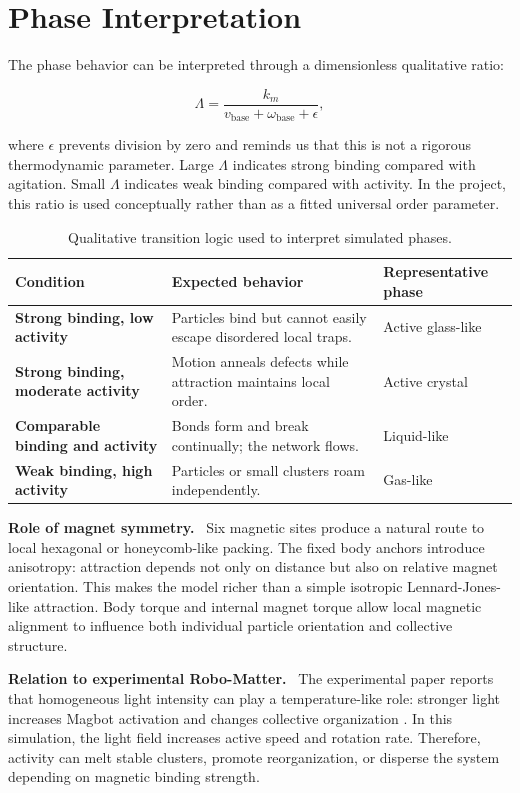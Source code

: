 \documentclass[12pt,a4paper,oneside]{report}
\newcommand{\runin}[1]{\vspace{0.45em}\noindent\textbf{#1.}\ }
\begin{document}
\section{Phase Interpretation}
The phase behavior can be interpreted through a dimensionless qualitative ratio:

\begin{equation}
\Lambda =
\frac{k_m}{v_{\mathrm{base}}+\omega_{\mathrm{base}}+\epsilon},
\end{equation}

where $\epsilon$ prevents division by zero and reminds us that this is not a rigorous thermodynamic parameter. Large $\Lambda$ indicates strong binding compared with agitation. Small $\Lambda$ indicates weak binding compared with activity. In the project, this ratio is used conceptually rather than as a fitted universal order parameter.

\begin{table}[H]
\centering
\caption{Qualitative transition logic used to interpret simulated phases.}
\label{tab:transitionlogic}
\begin{tabularx}{\textwidth}{>{\bfseries}p{3.2cm}X X}
\toprule
Condition & Expected behavior & Representative phase \\
\midrule
Strong binding, low activity & Particles bind but cannot easily escape disordered local traps. & Active glass-like \\
Strong binding, moderate activity & Motion anneals defects while attraction maintains local order. & Active crystal \\
Comparable binding and activity & Bonds form and break continually; the network flows. & Liquid-like \\
Weak binding, high activity & Particles or small clusters roam independently. & Gas-like \\
\bottomrule
\end{tabularx}
\end{table}

\runin{Role of magnet symmetry}
Six magnetic sites produce a natural route to local hexagonal or honeycomb-like packing. The fixed body anchors introduce anisotropy: attraction depends not only on distance but also on relative magnet orientation. This makes the model richer than a simple isotropic Lennard-Jones-like attraction. Body torque and internal magnet torque allow local magnetic alignment to influence both individual particle orientation and collective structure.

\runin{Relation to experimental Robo-Matter}
The experimental paper reports that homogeneous light intensity can play a temperature-like role: stronger light increases Magbot activation and changes collective organization \cite{wang2024robomatter}. In this simulation, the light field increases active speed and rotation rate. Therefore, activity can melt stable clusters, promote reorganization, or disperse the system depending on magnetic binding strength.
\end{document}
